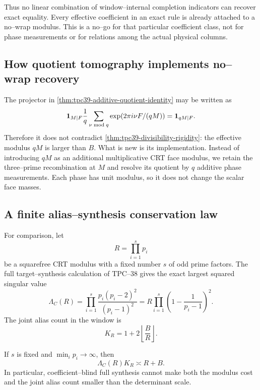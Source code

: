 Thus no linear combination of window--internal completion indicators can
recover exact equality.  Every effective coefficient in an exact rule is
already attached to a no--wrap modulus.  This is a no--go for that
particular coefficient class, not for phase measurements or for relations
among the actual physical columns.

\subsection{How quotient tomography implements no--wrap recovery}

The projector in \cref{thm:tpc39-additive-quotient-identity} may be written
as
\begin{equation}
 \mathbf 1_{M\mid F}\frac1q\sum_{\nu\bmod q}
 \exp(2\pi i \nu F/(qM))
 =\mathbf 1_{qM\mid F}.
 \label{eq:tpc39-phase-implements-superwindow}
\end{equation}
Therefore it does not contradict
\cref{thm:tpc39-divisibility-rigidity}: the effective modulus \(qM\) is
larger than \(B\).  What is new is its implementation.  Instead of
introducing \(qM\) as an additional multiplicative CRT face modulus, we
retain the three--prime recombination at \(M\) and resolve its quotient by
\(q\) additive phase measurements.  Each phase has unit modulus, so it
does not change the scalar face masses.

\subsection{A finite alias--synthesis conservation law}

For comparison, let
\begin{equation}
 R=\prod_{i=1}^{s}p_i
 \label{eq:tpc39-general-CRT-R}
\end{equation}
be a squarefree CRT modulus with a fixed number \(s\) of odd prime
factors.  The full target--synthesis calculation of TPC--38 gives the
exact largest squared singular value
\begin{equation}
 \Lambda_C(R)
 =\prod_{i=1}^{s}
 \frac{p_i(p_i-2)^2}{(p_i-1)^2}
 =R\prod_{i=1}^{s}
 \left(1-\frac1{p_i-1}\right)^2.
 \label{eq:tpc39-full-synthesis-R}
\end{equation}
The joint alias count in the window is
\begin{equation}
 K_R=1+2\left\lfloor\frac BR\right\rfloor.
 \label{eq:tpc39-alias-count-R}
\end{equation}

\begin{proposition}
\label{prop:tpc39-alias-synthesis-conservation}
If \(s\) is fixed and \(\min_i p_i\to\infty\), then
\begin{equation}
 \boxed{
 \Lambda_C(R)K_R\asymp R+B.}
 \label{eq:tpc39-alias-synthesis-conservation}
\end{equation}
In particular, coefficient--blind full synthesis cannot make both the
modulus cost and the joint alias count smaller than the determinant scale.
\end{proposition}

